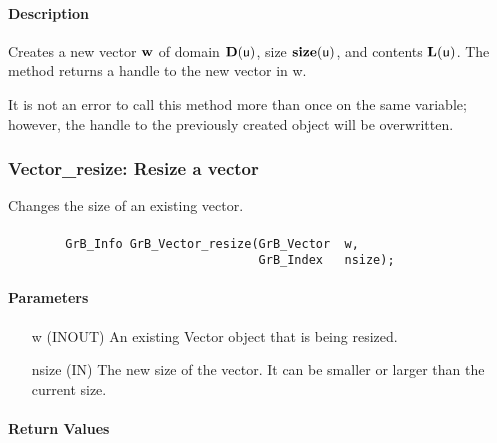 \paragraph{Description}

Creates a new vector ${\bf w}$ of domain $\mathbf{D}({\sf u})$, size 
$\mathbf{size}({\sf u})$, and contents $\mathbf{L}({\sf u})$. The method returns a 
handle to the new vector in {\sf w}.

It is not an error to call this method more than once on the same variable;  
however, the handle to the previously created object will be overwritten. 

\subsubsection{{\sf Vector\_resize}: Resize a vector}

Changes the size of an existing vector.

\paragraph{\syntax}

\begin{verbatim}
        GrB_Info GrB_Vector_resize(GrB_Vector  w,
                                   GrB_Index   nsize);
\end{verbatim}

\paragraph{Parameters}

\begin{itemize}[leftmargin=1.1in]
    \item[{\sf w}] ({\sf INOUT}) An existing Vector object that is being resized.
    \item[{\sf nsize}] ({\sf IN}) The new size of the vector. It can be smaller or larger than the current size.
\end{itemize}

\paragraph{Return Values}


